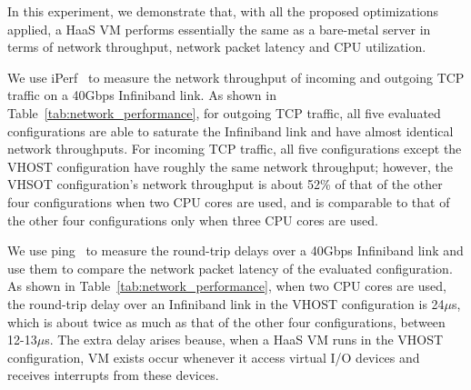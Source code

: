 In this experiment, we demonstrate that, with all  the proposed optimizations applied,  a HaaS VM performs essentially the same as a bare-metal server in terms of network throughput, network packet latency and CPU utilization.



We use  iPerf~\cite{iperf} to measure the network throughput of
incoming and outgoing TCP traffic on a 40Gbps Infiniband link.
As shown in Table~\ref{tab:network_performance}, for outgoing TCP traffic, 
all five evaluated configurations are able to saturate the Infiniband link and 
have almost identical network throughputs. 
For incoming TCP  traffic, all five configurations except the VHOST configuration have roughly the same network throughput; however, the VHSOT configuration's network throughput 
is about 52\% of that of the other four configurations when two CPU cores are used, and is comparable to that of the other four configurations only when three CPU cores are used. 



We use ping~\cite{ping} to measure the round-trip delays over a 40Gbps Infiniband link and use them to compare the network packet latency of the evaluated configuration. 
As shown in Table~\ref{tab:network_performance}, when two CPU cores are used, the round-trip delay over an Infiniband link in the 
VHOST configuration is 24$\mu$s, which is about twice as much as that of the other four configurations, between 12-13$\mu$s.
The extra delay arises beause, when a HaaS VM runs in the VHOST configuration, VM exists occur whenever it access virtual I/O devices and receives interrupts from these devices.





